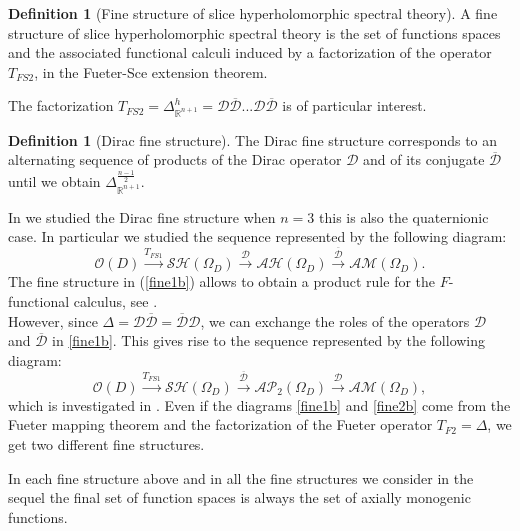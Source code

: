 \documentclass[reqno,11pt]{amsart}
\numberwithin{equation}{section}
\theoremstyle{definition}
\newtheorem{definition}[theorem]{Definition}
\begin{document}
\begin{definition}[Fine structure of slice hyperholomorphic spectral theory]
A fine structure of slice hyperholomorphic spectral theory is the set of functions spaces and the associated functional calculi induced by a factorization of the operator $T_{FS2}$, in the Fueter-Sce extension theorem.
\end{definition}
The factorization $ T_{FS2}=\Delta_{\mathbb{R}^{n+1}}^{h}= \mathcal{D} \mathcal{\overline{D}}... \mathcal{D}\mathcal{\overline{D}}$ is of particular interest.
\begin{definition}[Dirac fine structure]
The Dirac fine structure corresponds to an alternating sequence of products of the Dirac operator $\mathcal{D}$ and of its conjugate $ \mathcal{\overline{D}}$ until we obtain $\Delta_{\mathbb{R}^{n+1}}^{\frac{n-1}{2}}$.
\end{definition}
In \cite{CDPS} we studied the Dirac fine structure when $n=3$ this is also the quaternionic case. In particular we studied  the sequence represented by the following  diagram:
\begin{equation}
\label{fine1b}
\mathcal{O}(D) \overset{T_{FS1}}{\longrightarrow} \mathcal{SH}(\Omega_D)\overset{\mathcal{D}}{\longrightarrow} \mathcal{AH}(\Omega_D)\overset{\mathcal{\overline{D}}}{\longrightarrow}\mathcal{AM}(\Omega_D).
\end{equation}
The fine structure in (\ref{fine1b}) allows to obtain a product rule for the $F$-functional calculus, see \cite[Thm. 9.3]{CDPS}.
\\ However, since $\Delta=\mathcal{D} \mathcal{\overline{D}}= \mathcal{\overline{D}}\mathcal{D}$, we can exchange the roles of the operators $ \mathcal{D}$ and $ \mathcal{\overline{D}}$ in \eqref{fine1b}. This gives rise to the sequence represented by the following  diagram:
\begin{equation}
\label{fine2b}
\mathcal{O}(D) \overset{T_{FS1}}{\longrightarrow} \mathcal{SH}(\Omega_D)\overset{\mathcal{\overline{D}}}{\longrightarrow} \mathcal{AP}_2(\Omega_D)\overset{\mathcal{D}}{\longrightarrow}\mathcal{AM}(\Omega_D),
\end{equation}
which is investigated in \cite{CDPS1}.
 Even if the diagrams \eqref{fine1b} and \eqref{fine2b} come from the Fueter mapping theorem and the factorization of the Fueter operator $T_{F2}=\Delta$, we get two different fine structures.

\medskip
In each fine structure above and in all the fine structures we consider in the sequel
the final set of function spaces is always the set of axially monogenic functions.
\end{document}
